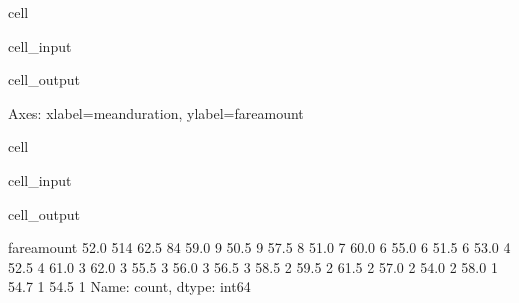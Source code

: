 \documentclass[letterpaper,10pt,english]{sphinxmanual}
\begin{document}
\begin{sphinxuseclass}{cell}
\begin{sphinxuseclass}{cell_input}
\begin{sphinxVerbatim}[commandchars=\\\{\}]
       
\end{sphinxVerbatim}

\end{sphinxuseclass}
\begin{sphinxuseclass}{cell_output}
\begin{sphinxVerbatim}[commandchars=\\\{\}]
\PYGZlt{}Axes: xlabel=\PYGZsq{}mean\PYGZus{}duration\PYGZsq{}, ylabel=\PYGZsq{}fare\PYGZus{}amount\PYGZsq{}\PYGZgt{}
\end{sphinxVerbatim}

\noindent{}

\end{sphinxuseclass}
\end{sphinxuseclass}
\begin{sphinxuseclass}{cell}
\begin{sphinxuseclass}{cell_input}
\begin{sphinxVerbatim}[commandchars=\\\{\}]
\PYG{p}{[}\PYG{p}{[}\PYG{p}{]}  \PYG{p}{]}\PYG{p}{[}\PYG{p}{]}
\end{sphinxVerbatim}

\end{sphinxuseclass}
\begin{sphinxuseclass}{cell_output}
\begin{sphinxVerbatim}[commandchars=\\\{\}]
fare\PYGZus{}amount
52.0    514
62.5     84
59.0      9
50.5      9
57.5      8
51.0      7
60.0      6
55.0      6
51.5      6
53.0      4
52.5      4
61.0      3
62.0      3
55.5      3
56.0      3
56.5      3
58.5      2
59.5      2
61.5      2
57.0      2
54.0      2
58.0      1
54.7      1
54.5      1
Name: count, dtype: int64
\end{sphinxVerbatim}

\end{sphinxuseclass}
\end{sphinxuseclass}
\end{document}
